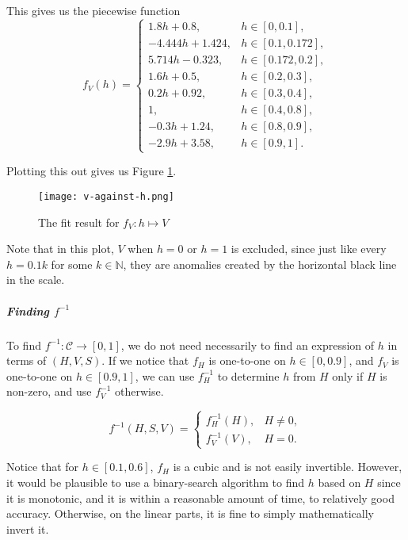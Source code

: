 This gives us the piecewise function
\[
    f_V(h) = \begin{cases}
        1.8h + 0.8,      & h \in [0, 0.1],     \\
        -4.444h + 1.424, & h \in [0.1, 0.172], \\
        5.714h - 0.323,  & h \in [0.172, 0.2], \\
        1.6h + 0.5,      & h \in [0.2, 0.3],   \\
        0.2h + 0.92,     & h \in [0.3, 0.4],   \\
        1,               & h \in [0.4, 0.8],   \\
        -0.3h + 1.24,    & h \in [0.8, 0.9],   \\
        -2.9h + 3.58,    & h \in [0.9, 1].
    \end{cases}
\]

Plotting this out gives us Figure \ref{fig:v-against-h}.

\begin{figure}[!ht]
    \centering
    \texttt{[image: v-against-h.png]}
    \caption{The fit result for \(f_V: h \mapsto V\)}
    \label{fig:v-against-h}
\end{figure}

Note that in this plot, \(V\) when \(h = 0\) or \(h = 1\) is excluded, since just like every \(h = 0.1 k\) for some \(k \in \mathbb{N}\), they are anomalies created by the horizontal black line in the scale.

\subparagraph{Finding \(f^{-1}\)}

To find \(f^{-1}: \mathcal{C} \to [0, 1]\), we do not need necessarily to find an expression of \(h\) in terms of \((H, V, S)\). If we notice that \(f_H\) is one-to-one on \(h \in [0, 0.9]\), and \(f_V\) is one-to-one on \(h \in [0.9, 1]\), we can use \(f_H^{-1}\) to determine \(h\) from \(H\) only if \(H\) is non-zero, and use \(f_V^{-1}\) otherwise.

\[
    f^{-1}(H, S, V) = \begin{cases}
        f_H^{-1}(H), & H \neq 0, \\
        f_V^{-1}(V), & H = 0.
    \end{cases}
\]

Notice that for \(h \in [0.1, 0.6]\), \(f_H\) is a cubic and is not easily invertible. However, it would be plausible to use a binary-search algorithm to find \(h\) based on \(H\) since it is monotonic, and it is within a reasonable amount of time, to relatively good accuracy. Otherwise, on the linear parts, it is fine to simply mathematically invert it.

